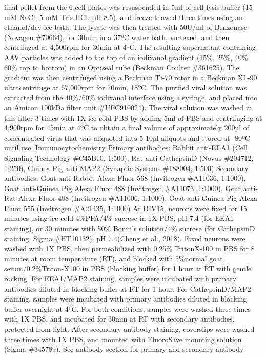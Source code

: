 final pellet from the 6 cell plates was resuspended in 5ml of cell lysis buffer
(15 mM NaCl, 5 mM Tris-HCl, pH 8.5), and freeze-thawed three times using an
ethanol/dry ice bath. The lysate was then treated with 50U/ml of Benzonase
(Novagen \#70664), for 30min in a 37ºC water bath, vortexed, and then centrifuged
at 4,500rpm for 30min at 4ºC. The resulting supernatant containing AAV particles
was added to the top of an iodixanol gradient (15\%, 25\%, 40\%, 60\% top to bottom)
in an Optiseal tube (Beckman Coulter \#361625). The gradient was then centrifuged
using a Beckman Ti-70 rotor in a Beckman XL-90 ultracentrifuge at 67,000rpm for
70min, 18ºC. The purified viral solution was extracted from the 40\%/60\%
iodixanol interface using a syringe, and placed into an Amicon 100kDa filter
unit \#UFC910024). The viral solution was washed in this filter 3 times with 1X
ice-cold PBS by adding 5ml of PBS and centrifuging at 4,900rpm for 45min at 4ºC
to obtain a final volume of approximately 200µl of concentrated virus that was
aliquoted into 5-10µl aliquots and stored at -80ºC until use. 
Immunocytochemistry
Primary antibodies: Rabbit anti-EEA1 (Cell Signaling Technology \#C45B10, 1:500),
Rat anti-CathepsinD (Novus \#204712, 1:250), Guinea Pig anti-MAP2 (Synaptic
Systems \#188004, 1:500)
Secondary antibodies: Goat anti-Rabbit Alexa Fluor 568 (Invitrogen \#A11036,
1:1000), Goat anti-Guinea Pig Alexa Fluor 488 (Invitrogen \#A11073, 1:1000), Goat
anti-Rat Alexa Fluor 488 (Invitrogen \#A11006, 1:1000), Goat anti-Guinea Pig
Alexa Fluor 555 (Invitrogen \#A21435, 1:1000)
	At DIV15, neurons were fixed for 15 minutes using ice-cold 4\%PFA/4\%
sucrose in 1X PBS, pH 7.4 (for EEA1 staining), or 30 minutes with 50\% Bouin’s
solution/4\% sucrose (for CathepsinD staining, Sigma \#HT10132), pH 7.4(Cheng et
al., 2018). Fixed neurons were washed with 1X PBS, then permeabilized with 0.25\%
TritonX-100 in PBS for 8 minutes at room temperature (RT), and blocked with
5\%normal goat serum/0.2\%Triton-X100 in PBS (blocking buffer) for 1 hour at RT
with gentle rocking. For EEA1/MAP2 staining, samples were incubated with primary
antibodies diluted in blocking buffer at RT for 1 hour. For CathepsinD/MAP2
staining, samples were incubated with primary antibodies diluted in blocking
buffer overnight at 4ºC. For both conditions, samples were washed three times
with 1X PBS, and incubated for 30min at RT with secondary antibodies, protected
from light. After secondary antibody staining, coverslips were washed three
times with 1X PBS, and mounted with FluoroSave mounting solution (Sigma
\#345789). See antibody section for primary and secondary antibody
